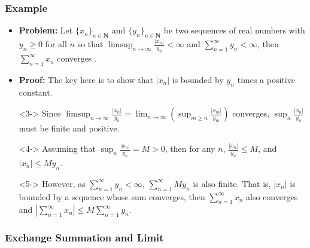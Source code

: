 \documentclass[handout]{beamer}
\begin{document}
\frame
{
  \frametitle{Example}

   \begin{itemize}
  \item <1-> \textbf{Problem:}  Let $\{x_{n}\}_{n\in \mathbf{N}}$ and $\{y_{n}\}_{n\in \mathbf{N}}$ be two sequences of real numbers with $y_n\geq 0$ for all $n$ so that $\limsup_{n\rightarrow \infty} \frac{|x_n|}{y_n} <\infty$ and $\sum_{n=1}^{\infty} y_n<\infty$, then  $\sum_{n=1}^{\infty} x_n$ converges .
  
   \item<2-> \textbf{Proof:}  The key here is to show that $|x_n|$ is bounded by $y_n$ times a positive constant. 
   \item[]<3-> Since  $\limsup_{n\rightarrow \infty} \frac{|x_n|}{y_n}=\lim_{n\rightarrow \infty} (\sup_{m\geq n} \frac{|x_m|}{y_m} )$ converges, $\sup_{ n} \frac{|x_n|}{y_n}$ must be finite and positive. 
      \item[]<4-> Assuming that $\sup_{ n} \frac{|x_n|}{y_n}=M>0$, then for any $n$, $\frac{|x_n|}{y_n}\leq M$, and $|x_n|\leq M y_n$. 

      \item[]<5-> However, as $\sum_{n=1}^{\infty} y_n<\infty$, $\sum_{n=1}^{\infty} M y_n$ is also finite. That is, $|x_n|$ is bounded by a sequence whose sum converges, then $\sum_{n=1}^{\infty} x_n$ also converges and $|\sum_{n=1}^{\infty} x_n|\leq M \sum_{n=1}^{\infty}  y_n$.   
         
       
  \end{itemize}
}




\subsubsection{Exchange Summation and Limit}
\end{document}
